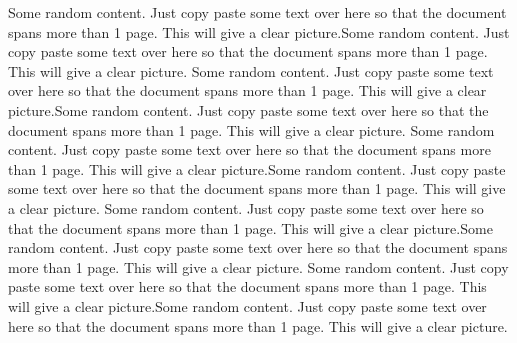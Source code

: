 \documentclass{article}
\begin{document}
	Some random content. Just copy paste some text over here so that the document spans more than 1 page. This will give a clear picture.Some random content. Just copy paste some text over here so that the document spans more than 1 page. This will give a clear picture.
	Some random content. Just copy paste some text over here so that the document spans more than 1 page. This will give a clear picture.Some random content. Just copy paste some text over here so that the document spans more than 1 page. This will give a clear picture.
	Some random content. Just copy paste some text over here so that the document spans more than 1 page. This will give a clear picture.Some random content. Just copy paste some text over here so that the document spans more than 1 page. This will give a clear picture.
	Some random content. Just copy paste some text over here so that the document spans more than 1 page. This will give a clear picture.Some random content. Just copy paste some text over here so that the document spans more than 1 page. This will give a clear picture.
	Some random content. Just copy paste some text over here so that the document spans more than 1 page. This will give a clear picture.Some random content. Just copy paste some text over here so that the document spans more than 1 page. This will give a clear picture.
\end{document}
